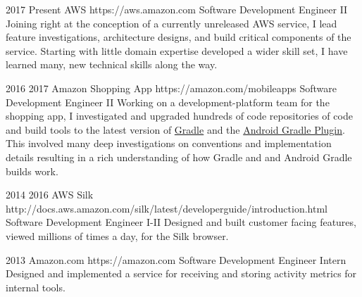 \job
{2017} {Present}
{AWS} {https://aws.amazon.com}
{Software Development Engineer II}
{
    Joining right at the conception of a currently unreleased AWS service, I lead feature investigations, architecture designs, and build critical components of the service. Starting with little domain expertise developed a wider skill set, I have learned many, new technical skills along the way.
}

\job
{2016} {2017}
{Amazon Shopping App} {https://amazon.com/mobileapps}
{Software Development Engineer II}
{
    Working on a development-platform team for the shopping app, I investigated and upgraded hundreds of code repositories of code and build tools to the latest version of \href {https://gradle.org} {Gradle} and the \href {https://developer.android.com/studio/build/index.html} {Android Gradle Plugin}. This involved many deep investigations on conventions and implementation details resulting in a rich understanding of how Gradle and and Android Gradle builds work.
}

\job
{2014} {2016}
{AWS Silk} {http://docs.aws.amazon.com/silk/latest/developerguide/introduction.html}
{Software Development Engineer I-II}
{
    Designed and built customer facing features, viewed millions of times a day, for the Silk browser.
}

\job
{2013} {}
{Amazon.com} {https://amazon.com}
{Software Development Engineer Intern}
{
    Designed and implemented a service for receiving and storing activity metrics for internal tools.
}